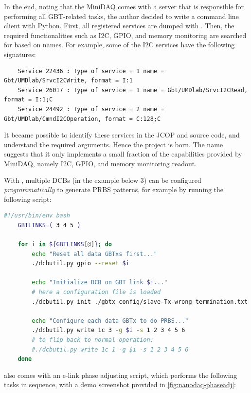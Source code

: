 In the end,
noting that the MiniDAQ comes with a \dim server that is responsible for
performing all GBT-related tasks,
the author decided to write a command line \dim client with Python.
First, all registered \dim services are dumped with \pydim
\cite{pydim}.
Then, the required functionalities such as I2C, GPIO, and memory
monitoring are searched for based on names.
For example, some of the I2C services have the following signatures:

\begin{lstlisting}
    Service 22436 : Type of service = 1 name = Gbt/UMDlab/SrvcI2CWrite, format = I:1
    Service 26017 : Type of service = 1 name = Gbt/UMDlab/SrvcI2CRead, format = I:1;C
    Service 24492 : Type of service = 2 name = Gbt/UMDlab/CmndI2COperation, format = C:128;C
\end{lstlisting}

It became possible to identify these services in the JCOP and 
source code,
and understand the required arguments.
Hence the \nanoDAQ project \cite{nanoDAQ} is born.
The name suggests that it only implements a small fraction of the capabilities
provided by MiniDAQ, namely I2C, GPIO, and memory monitoring readout.

With \nanoDAQ, multiple DCBs (in the example below 3) can be configured
\emph{programmatically} to generate PRBS patterns,
for example by running the following  script:

\begin{lstlisting}[language=Bash]
    #!/usr/bin/env bash
    GBTLINKS=( 3 4 5 )

    for i in ${GBTLINKS[@]}; do
        echo "Reset all data GBTxs first..."
        ./dcbutil.py gpio --reset $i

        echo "Initialize DCB on GBT link $i..."
        # here a configuration file is loaded
        ./dcbutil.py init ./gbtx_config/slave-Tx-wrong_termination.txt -g $i

        echo "Configure each data GBTx to do PRBS..."
        ./dcbutil.py write 1c 3 -g $i -s 1 2 3 4 5 6
        # to flip back to normal operation:
        #./dcbutil.py write 1c 1 -g $i -s 1 2 3 4 5 6
    done
\end{lstlisting}

\nanoDAQ also comes with an e-link phase adjusting script, which performs the
following tasks in sequence,
with a demo screenshot provided in \cref{fig:nanodaq-phaseadj}:


